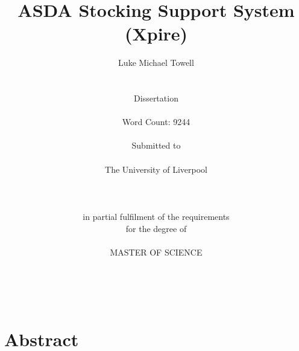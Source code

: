 \documentclass[a4paper,11pt]{report}
\begin{document}



\thispagestyle{empty}

\title{\LARGE
ASDA Stocking Support System (Xpire)}

\author{
Luke Michael Towell
\\    \\    \\
Dissertation
\\    \\
Word Count: 9244
\\    \\
Submitted to 
\\    \\
The University of Liverpool
\\    \\
\\    \\
in partial fulfilment of the requirements
\\
for the degree of 
\\     \\
MASTER OF SCIENCE
\\     \\    \\    \\
}


\date{}


\maketitle


\chapter*{\center Abstract}
\end{document}
